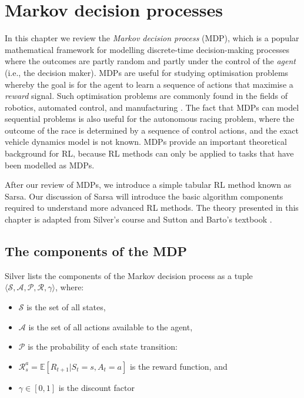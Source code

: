 \chapter{Markov decision processes}
\label{chp:mdps}
In this chapter we review the \emph{Markov decision process} (MDP), which is a popular mathematical framework for modelling discrete-time decision-making processes where the outcomes are partly random and partly under the control of the \emph{agent} (i.e., the decision maker).
MDPs are useful for studying optimisation problems whereby the goal is for the agent to learn a sequence of actions that maximise a \emph{reward} signal.
Such optimisation problems are commonly found in the fields of robotics, automated control, and manufacturing \cite{White1985}.
The fact that MDPs can model sequential problems is also useful for the autonomous racing problem, where the outcome of the race is determined by a sequence of control actions, and the exact vehicle dynamics model is not known.
MDPs provide an important theoretical background for RL, because RL methods can only be applied to tasks that have been modelled as MDPs.

After our review of MDPs, we introduce a simple tabular RL method known as Sarsa.
Our discussion of Sarsa will introduce the basic algorithm components required to understand more advanced RL methods.
The theory presented in this chapter is adapted from Silver's course \cite{silver2015} and Sutton and Barto's textbook \cite{sutton2020}.

\section{The components of the MDP}
\label{sec:agent_environment_interface}

Silver \cite{silver2015} lists the components of the Markov decision process as a tuple $\langle \mathcal{S,A,P,R}, \gamma \rangle$, where: 
\begin{itemize}
    \item $\mathcal{S}$ is the set of all states,
    \item $\mathcal{A}$ is the set of all actions available to the agent,
    \item $\mathcal{P}$ is the probability of each state transition:
    \item $\mathcal{R}_{s}^{a} = \mathbb{E} [R_{t+1} | S_t=s, A_t=a]$ is the reward function, and
    \item $\gamma \in [0,1]$ is the discount factor
\end{itemize}


